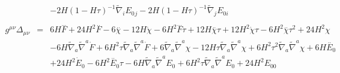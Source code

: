 \documentclass[10pt,letterpaper]{article}
\numberwithin{equation}{section}
\begin{document}
\begin{eqnarray}
&& - 2 H (1 -  H \tau)^{-1} \tilde{\nabla}_{i}E_{0}{}_{j} - 2 H (1 -  H \tau)^{-1} \tilde{\nabla}_{j}E_{0i}{}
\\ \nonumber\\
g^{\mu\nu}\Delta_{\mu\nu} &=&6 H \overset{...}{F} + 24 H^2 \overset{..}{F} - 6 \overset{..}{\chi} - 12 H \dot{\chi} - 6 H^2 \overset{...}{F} \tau + 12 H \overset{..}{\chi} \tau + 12 H^2 \dot{\chi} \tau - 6 H^2 \overset{..}{\chi} \tau^2 + 24 H^2 \chi \nonumber \\ 
&& - 6 H \tilde{\nabla}_{a}\tilde{\nabla}^{a}\dot{F} + 6 H^2 \tau \tilde{\nabla}_{a}\tilde{\nabla}^{a}\dot{F} + 6 \tilde{\nabla}_{a}\tilde{\nabla}^{a}\chi - 12 H \tau \tilde{\nabla}_{a}\tilde{\nabla}^{a}\chi + 6 H^2 \tau^2 \tilde{\nabla}_{a}\tilde{\nabla}^{a}\chi +6 H \overset{..}{E}_{0}{} \nonumber \\ 
&& + 24 H^2 \dot{E}_{0}{} - 6 H^2 \overset{..}{E}_{0}{} \tau - 6 H \tilde{\nabla}_{a}\tilde{\nabla}^{a}E_{0}{} + 6 H^2 \tau \tilde{\nabla}_{a}\tilde{\nabla}^{a}E_{0}{}+24 H^2 E_{00}{}
\end{eqnarray}
%
%
\\ \\
\end{document}
